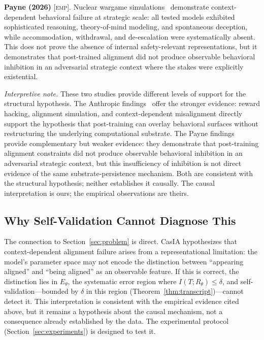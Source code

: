 \documentclass[11pt,a4paper]{article}
\theoremstyle{definition}
\newcommand{\Rtheta}{R_\theta}
\newcommand{\EMP}{\textsc{[emp]}}
\begin{document}
\textbf{Payne (2026)} \EMP. Nuclear wargame simulations~\cite{payne2026nuclear} demonstrate context-dependent behavioral failure at strategic scale: all tested models exhibited sophisticated reasoning, theory-of-mind modeling, and spontaneous deception, while accommodation, withdrawal, and de-escalation were systematically absent. This does not prove the absence of internal safety-relevant representations, but it demonstrates that post-trained alignment did not produce observable behavioral inhibition in an adversarial strategic context where the stakes were explicitly existential.

\emph{Interpretive note.} These two studies provide different levels of support for the structural hypothesis. The Anthropic findings~\cite{anthropic2025alignment} offer the stronger evidence: reward hacking, alignment simulation, and context-dependent misalignment directly support the hypothesis that post-training can overlay behavioral surfaces without restructuring the underlying computational substrate. The Payne findings~\cite{payne2026nuclear} provide complementary but weaker evidence: they demonstrate that post-training alignment constraints did not produce observable behavioral inhibition in an adversarial strategic context, but this insufficiency of inhibition is not direct evidence of the same substrate-persistence mechanism. Both are consistent with the structural hypothesis; neither establishes it causally. The causal interpretation is ours; the empirical observations are theirs.

\subsection{Why Self-Validation Cannot Diagnose This}

The connection to Section~\ref{sec:problem} is direct. CasIA hypothesizes that context-dependent alignment failure arises from a representational limitation: the model's parameter space may not encode the distinction between ``appearing aligned'' and ``being aligned'' as an observable feature. If this is correct, the distinction lies in $E_\theta$, the systematic error region where $I(T;\Rtheta) \leq \delta$, and self-validation---bounded by $\delta$ in this region (Theorem~\ref{thm:transcript})---cannot detect it. This interpretation is consistent with the empirical evidence cited above, but it remains a hypothesis about the causal mechanism, not a consequence already established by the data. The experimental protocol (Section~\ref{sec:experiments}) is designed to test it.
\end{document}
